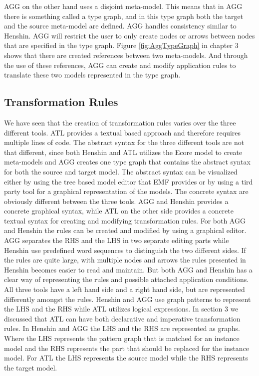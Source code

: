 AGG on the other hand uses a disjoint meta-model. This means that in AGG there
is something called a type graph, and in this type graph both the target and
the source meta-model are defined. AGG handles consistency similar to
Henshin. AGG will restrict the user to only create nodes or arrows between
nodes that are specified in the type graph. Figure \ref{fig:AggTypeGraph}
in chapter 3 shows that there are created references between two meta-models. And
through the use of these references, AGG can create and modify application
rules to translate these two models represented in the type graph. 
 
\subsection{Transformation Rules}
We have seen that the creation of transformation rules varies over the three
different tools. ATL provides a textual based approach and therefore requires
multiple lines of code. The abstract syntax for the three different tools are
not that different, since both Henshin and ATL utilizes the Ecore model to
create meta-models and AGG creates one type graph that contains the abstract
syntax for both the source and target model. The abstract syntax can be
visualized either by using the tree based model editor that EMF provides or by
using a tird party tool for a graphical representation of the models. The
concrete syntax are obviously different between the three tools. AGG and Henshin
provides a concrete graphical syntax, while ATL on the other side provides a
concrete textual syntax for creating and modifying transformation rules. For
both AGG and Henshin the rules can be created and modified by using a graphical
editor. AGG separates the RHS and the LHS in two separate editing parts while
Henshin use predefined word sequences to distinguish the two different sides.
If the rules are quite large, with multiple nodes and arrows the rules
presented in Henshin becomes easier to read and maintain. But both AGG and
Henshin has a clear way of representing the rules and possible attached
application conditions. All three tools have a left hand side
and a right hand side, but are represented differently amongst the rules.
Henshin and AGG use graph patterns to represent the LHS and the RHS while ATL
utilizes logical expressions. In section 3 we discussed that ATL can have both
declarative and imperative transformation rules. In Henshin and AGG the LHS and
the RHS are represented as graphs. Where the LHS represents the pattern graph
that is matched for an instance model and the RHS represents the part that should be
replaced for the instance model. For ATL the LHS represents the source model
while the RHS represents the target model. 

